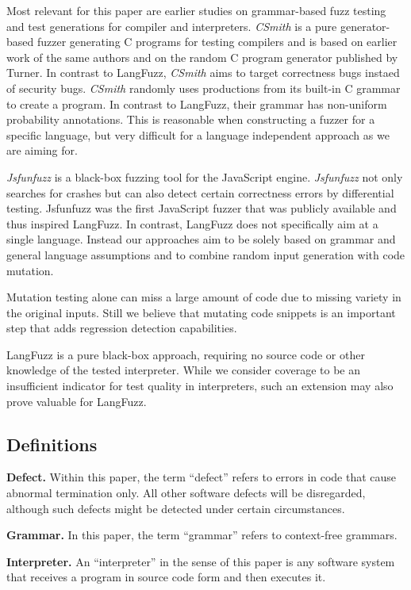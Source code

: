 Most relevant for this paper are earlier studies on grammar-based fuzz testing and test generations for compiler and interpreters.
\textit{CSmith} is a pure generator-based fuzzer generating C programs for testing compilers and is based on earlier work of the same authors and on the random C program generator published by Turner. In contrast to LangFuzz, \textit{CSmith} aims to target correctness bugs instaed of security bugs. \textit{CSmith} randomly uses productions from its built-in C grammar to create a program. In contrast to LangFuzz, their grammar has non-uniform probability annotations.
This is reasonable when constructing a fuzzer for a specific language, but very difficult for a language independent approach as we are aiming for.

\textit{Jsfunfuzz} is a black-box fuzzing tool for the JavaScript engine. \textit{Jsfunfuzz} not only searches for crashes but can also detect certain correctness errors by differential testing.
Jsfunfuzz was the first JavaScript fuzzer that was publicly available and thus inspired LangFuzz. In contrast, LangFuzz does not specifically aim at a single language.
Instead our approaches aim to be solely based on grammar and general language assumptions and to combine random input generation with code mutation.

Mutation testing alone can miss a large amount of code due to missing variety in the original inputs.
Still we believe that mutating code snippets is an important step that adds regression detection capabilities.

LangFuzz is a pure black-box approach, requiring no source code or other knowledge of the tested interpreter.
While we consider coverage to be an insufficient indicator for test quality in interpreters, such an extension may also prove valuable for LangFuzz.

\subsection{Definitions}
\textbf{Defect.} Within this paper, the term ``defect'' refers to errors in code that cause abnormal termination only.
All other software defects will be disregarded, although such defects might be detected under certain circumstances.

\textbf{Grammar.} In this paper, the term ``grammar'' refers to context-free grammars.

\textbf{Interpreter.} An ``interpreter'' in the sense of this paper is any software system that receives a program in source code form and then executes it.

